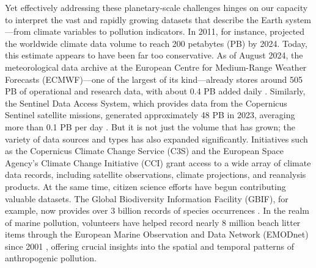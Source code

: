 Yet effectively addressing these planetary-scale challenges hinges on our capacity to interpret the vast and rapidly growing datasets that describe the Earth system---from climate variables to pollution indicators. In 2011, for instance, \citet{overpeck_climate_2011} projected the worldwide climate data volume to reach 200 petabytes (PB) by 2024. Today, this estimate appears to have been far too conservative. As of August 2024, the meteorological data archive at the European Centre for Medium-Range Weather Forecasts (ECMWF)---one of the largest of its kind---already stores around 505 PB of operational and research data, with about 0.4 PB added daily \cite{ecmwf_key_2022}. Similarly, the Sentinel Data Access System, which provides data from the Copernicus Sentinel satellite missions, generated approximately 48 PB in 2023, averaging more than 0.1 PB per day \cite{cipoletta_copernicus_2024}. But it is not just the volume that has grown; the variety of data sources and types has also expanded significantly. Initiatives such as the Copernicus Climate Change Service (C3S) and the European Space Agency's Climate Change Initiative (CCI) grant access to a wide array of climate data records, including satellite observations, climate projections, and reanalysis products. At the same time, citizen science efforts have begun contributing valuable datasets. The Global Biodiversity Information Facility (GBIF), for example, now provides over 3 billion records of species occurrences \cite{gbif_gbif_2024}. In the realm of marine pollution, volunteers have helped record nearly 8 million beach litter items through the European Marine Observation and Data Network (EMODnet) since 2001 \cite{molina_jack_emodnet_2019, molina_jack_mediterranean_2023, emodnet_beach_2024}, offering crucial insights into the spatial and temporal patterns of anthropogenic pollution.

